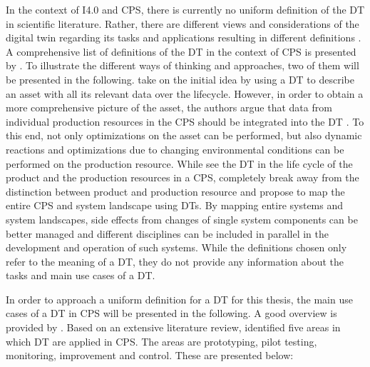 In the context of \ac{I4.0} and \ac{CPS}, there is currently no uniform definition of the \ac{DT} in scientific literature. Rather, there are different views and considerations of the digital twin regarding its tasks and applications resulting in different definitions \cite[p. 4]{Deuter2019TheTheory}. A comprehensive list of definitions of the \ac{DT} in the context of \ac{CPS} is presented by \citet[p. 941]{Negri2017ASystems}. To illustrate the different ways of thinking and approaches, two of them will be presented in the following. \citet[p. 567]{Rosen2015AboutManufacturing} take on the initial idea by using a \ac{DT} to describe an asset with all its relevant data over the lifecycle. However, in order to obtain a more comprehensive picture of the asset, the authors argue that data from individual production resources in the \ac{CPS} should be integrated into the \ac{DT} \cite[p. 569]{Rosen2015AboutManufacturing}. To this end, not only optimizations on the asset can be performed, but also dynamic reactions and optimizations due to changing environmental conditions can be performed on the production resource. While \citeauthor{Rosen2015AboutManufacturing} see the \ac{DT} in the life cycle of the product and the production resources in a \ac{CPS}, \citet[p. 3]{Schluse2016FromSystems} completely break away from the distinction between product and production resource and propose to map the entire \ac{CPS} and system landscape using \ac{DT}s. By mapping entire systems and system landscapes, side effects from changes of single system components can be better managed and different disciplines can be included in parallel in the development and operation \cite[p. 2]{Schluse2016FromSystems} of such systems. While the definitions chosen only refer to the meaning of a \ac{DT}, they do not provide any information about the tasks and main use cases of a \ac{DT}. 

In order to approach a uniform definition for a \ac{DT} for this thesis, the main use cases of a \ac{DT} in \ac{CPS} will be presented in the following. A good overview is provided by \citet{Son2021PastManufacturing}. Based on an extensive literature review, \citet{Son2021PastManufacturing} identified five areas in which \ac{DT} are applied in \ac{CPS}. The areas are prototyping, pilot testing, monitoring, improvement and control. These are presented below:

